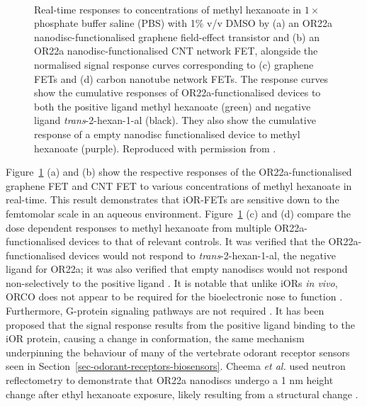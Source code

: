 \documentclass[
  a4paper,
]{scrbook}
\begin{document}
\begin{figure}
\begin{minipage}[t]{0.45\linewidth}
{{}

}

\end{minipage}%
%
\begin{minipage}[t]{0.01\linewidth}

{\centering 

~

}

\end{minipage}%

\caption[Real-time sensing behaviour of graphene and carbon nanotube
network field-effect transistors before and after OR22a
functionalisation.]{\label{fig-iOR-sensing-literature}Real-time
responses to concentrations of methyl hexanoate in \(1 \times\)
phosphate buffer saline (PBS) with 1\% v/v DMSO by (a) an OR22a
nanodisc-functionalised graphene field-effect transistor and (b) an
OR22a nanodisc-functionalised CNT network FET, alongside the normalised
signal response curves corresponding to (c) graphene FETs and (d) carbon
nanotube network FETs. The response curves show the cumulative responses
of OR22a-functionalised devices to both the positive ligand methyl
hexanoate (green) and negative ligand \emph{trans}-2-hexan-1-al (black).
They also show the cumulative response of a empty nanodisc
functionalised device to methyl hexanoate (purple). Reproduced with
permission from \autocite{Murugathas2019a,Murugathas2020}.}

\end{figure}

Figure~\ref{fig-iOR-sensing-literature} (a) and (b) show the respective
responses of the OR22a-functionalised graphene FET and CNT FET to
various concentrations of methyl hexanoate in real-time. This result
demonstrates that iOR-FETs are sensitive down to the femtomolar scale in
an aqueous environment. Figure~\ref{fig-iOR-sensing-literature} (c) and
(d) compare the dose dependent responses to methyl hexanoate from
multiple OR22a-functionalised devices to that of relevant controls. It
was verified that the OR22a-functionalised devices would not respond to
\emph{trans}-2-hexan-1-al, the negative ligand for OR22a; it was also
verified that empty nanodiscs would not respond non-selectively to the
positive ligand \autocite{Murugathas2019a,Murugathas2020}. It is notable
that unlike iORs \emph{in vivo}, ORCO does not appear to be required for
the bioelectronic nose to function
\autocite{Murugathas2019a,Murugathas2020,Khadka2019,Cheema2021}.
Furthermore, G-protein signaling pathways are not required
\autocite{Sato2014}. It has been proposed that the signal response
results from the positive ligand binding to the iOR protein, causing a
change in conformation, the same mechanism underpinning the behaviour of
many of the vertebrate odorant receptor sensors seen in
Section~\ref{sec-odorant-receptors-biosensors}. Cheema \emph{et al.}
used neutron reflectometry to demonstrate that OR22a nanodiscs undergo a
1 nm height change after ethyl hexanoate exposure, likely resulting from
a structural change \autocite{Cheema2021}.
\end{document}
